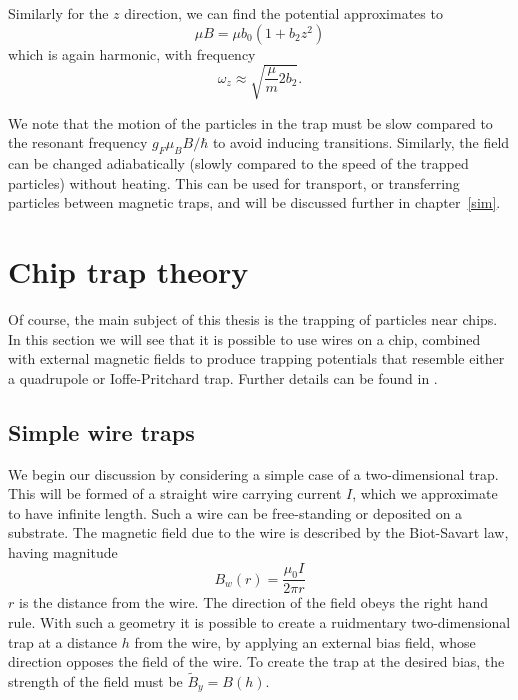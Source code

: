 Similarly for the $z$ direction, we can find the potential
approximates to
%
\begin{equation}
  \mu B = \mu b_0 (1 + b_2 z^2)
\end{equation}
%
which is again harmonic, with frequency
%
\begin{equation}
  \omega_z \approx \sqrt{\frac{\mu}{m}2b_2}.
\end{equation}

We note that the motion of the particles in the trap must be slow compared to
the resonant frequency $g_F\mu_BB/\hbar$ to avoid inducing transitions.
Similarly, the field can be changed adiabatically (slowly compared to the speed
of the trapped particles) without heating. This can be used for
transport, or transferring particles between magnetic traps, and will be
discussed further in chapter~\ref{sim}.

\section{Chip trap theory}
\label{theory:chips}

Of course, the main subject of this thesis is the trapping of particles near
chips. In this section we will see that it is possible to use wires on a chip,
combined with external magnetic fields to produce trapping potentials that
resemble either a quadrupole or Ioffe-Pritchard trap. Further details can be
found in .

\subsection{Simple wire traps}

We begin our discussion by considering a simple case of a two-dimensional trap.
This will be formed of a straight wire carrying current $I$, which we
approximate to have infinite length. Such a wire can be free-standing or
deposited on a substrate. The magnetic field due to the wire is described by
the Biot-Savart law, having magnitude
%
\begin{equation}
  B_w(r) = \frac{\mu_0 I}{2 \pi r}
\end{equation}
%
$r$ is the distance from the wire. The direction of the field obeys the right
hand rule. With such a geometry it is possible to create a ruidmentary
two-dimensional trap at a distance $h$ from the wire, by applying an external
bias field, whose direction opposes the field of the wire. To create the trap
at the desired bias, the strength of the field must be $\tilde{B}_y =
B(h)$.

